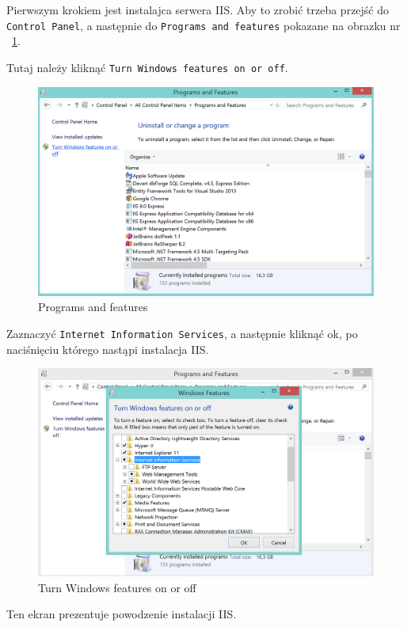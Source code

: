 \documentclass[10pt,titlepage]{article}
\begin{document}
\par Pierwszym krokiem jest instalajca serwera IIS. Aby to zrobić trzeba przejść do \verb|Control Panel|, a następnie do \verb|Programs and features| pokazane na obrazku nr ~\ref{install:programs}.
\par Tutaj należy kliknąć \verb|Turn Windows features on or off|.
\begin{figure}[H]
  \centering
  \includegraphics[scale=0.35]{images/install1.png}
  \caption{Programs and features}
  \label{install:programs}
\end{figure}
\par Zaznaczyć \verb|Internet Information Services|, a następnie kliknąć ok, po naciśnięciu którego nastąpi instalacja IIS.
\begin{figure}[H]
  \centering
  \includegraphics[scale=0.35]{images/install2.png}
  \caption{Turn Windows features on or off}
\end{figure}
\par Ten ekran prezentuje powodzenie instalacji IIS.
\end{document}
